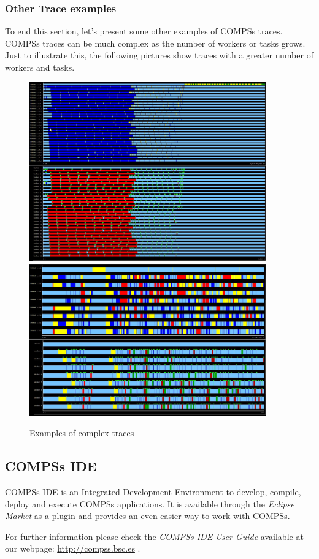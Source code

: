 \subsubsection{Other Trace examples}
To end this section, let’s present some other examples of COMPSs traces. COMPSs traces can be 
much complex as the number of workers or tasks grows. Just to illustrate this, the following 
pictures show traces with a greater number of workers and tasks.

\begin{figure}[ht!]
  \centering
    \includegraphics[width=0.91\textwidth]{./Sections/4_Tools/Figures/16.jpeg}
    \includegraphics[width=0.91\textwidth]{./Sections/4_Tools/Figures/16_2.jpeg}
    \caption{Examples of complex traces}
\end{figure}

\newpage
\subsection{COMPSs IDE}
\label{subsec:IDE}
COMPSs IDE is an Integrated Development Environment to develop, compile, deploy and execute COMPSs applications. It is available
through the \textit{Eclipse Market} as a plugin and provides an even easier way to work with COMPSs.

For further information please check the \textit{COMPSs IDE User Guide} available at our webpage: \url{http://compss.bsc.es} .
